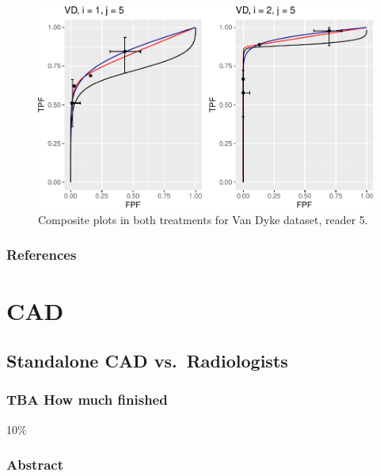 \documentclass[
]{book}
\begin{document}
\begin{figure}
\centering
\includegraphics{19b-rsm-3-fits_files/figure-latex/rsm-3-fits-plots-1-5-1.pdf}
\caption{\label{fig:rsm-3-fits-plots-1-5}Composite plots in both treatments for Van Dyke dataset, reader 5.}
\end{figure}

\hypertarget{rsm-3-fits-references}{%
\section{References}\label{rsm-3-fits-references}}

\hypertarget{part-cad}{%
\part*{CAD}\label{part-cad}}

\hypertarget{standalone-cad-radiologists}{%
\chapter{Standalone CAD vs.~Radiologists}\label{standalone-cad-radiologists}}

\hypertarget{standalone-cad-radiologists-how-much-finished}{%
\section{TBA How much finished}\label{standalone-cad-radiologists-how-much-finished}}

10\%

\hypertarget{standalone-cad-radiologists-abstract}{%
\section{Abstract}\label{standalone-cad-radiologists-abstract}}
\end{document}
